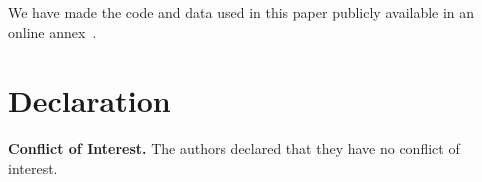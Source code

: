 We have made the code and data used in this paper publicly available in an online annex~\cite{annex}.
\section*{Declaration}
\textbf{Conflict of Interest.} The authors declared that they have no conflict of interest.
